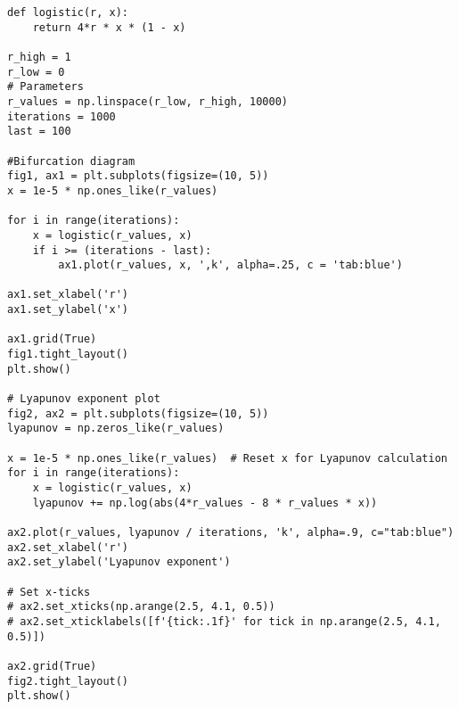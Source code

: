 \begin{lstlisting}[style=python]
def logistic(r, x):
    return 4*r * x * (1 - x)

r_high = 1
r_low = 0
# Parameters
r_values = np.linspace(r_low, r_high, 10000)
iterations = 1000
last = 100

#Bifurcation diagram
fig1, ax1 = plt.subplots(figsize=(10, 5))
x = 1e-5 * np.ones_like(r_values)

for i in range(iterations):
    x = logistic(r_values, x)
    if i >= (iterations - last):
        ax1.plot(r_values, x, ',k', alpha=.25, c = 'tab:blue')

ax1.set_xlabel('r')
ax1.set_ylabel('x')

ax1.grid(True)
fig1.tight_layout()
plt.show()

# Lyapunov exponent plot
fig2, ax2 = plt.subplots(figsize=(10, 5))
lyapunov = np.zeros_like(r_values)

x = 1e-5 * np.ones_like(r_values)  # Reset x for Lyapunov calculation
for i in range(iterations):
    x = logistic(r_values, x)
    lyapunov += np.log(abs(4*r_values - 8 * r_values * x))

ax2.plot(r_values, lyapunov / iterations, 'k', alpha=.9, c="tab:blue")
ax2.set_xlabel('r')
ax2.set_ylabel('Lyapunov exponent')

# Set x-ticks
# ax2.set_xticks(np.arange(2.5, 4.1, 0.5))
# ax2.set_xticklabels([f'{tick:.1f}' for tick in np.arange(2.5, 4.1, 0.5)])

ax2.grid(True)
fig2.tight_layout()
plt.show()
\end{lstlisting}
